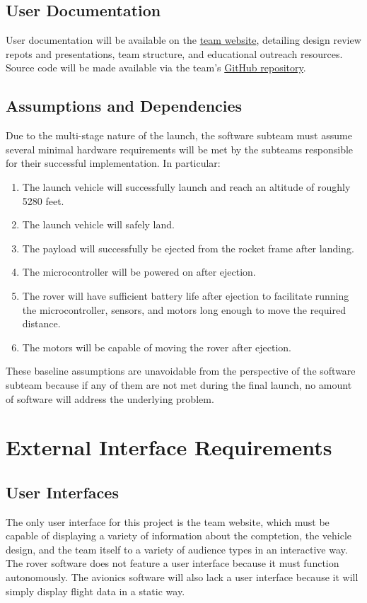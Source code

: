 \documentclass[onecolumn, draftclsnofoot, 10pt, compsoc]{IEEEtran}
\begin{document}
\subsection{User Documentation}
User documentation will be available on the \href{http://osuusli.com/}{team website}, detailing design review repots and presentations, team structure, and educational outreach resources. Source code will be made available via the team's \href{https://github.com/OSU-USLI-18/Payload-Software}{GitHub repository}.

\subsection{Assumptions and Dependencies}
Due to the multi-stage nature of the launch, the software subteam must assume several minimal hardware requirements will be met by the subteams responsible for their successful implementation. In particular:
\begin{enumerate}
\item The launch vehicle will successfully launch and reach an altitude of roughly 5280 feet.
\item The launch vehicle will safely land.
\item The payload will successfully be ejected from the rocket frame after landing.
\item The microcontroller will be powered on after ejection.
\item The rover will have sufficient battery life after ejection to facilitate running the microcontroller, sensors, and motors long enough to move the required distance.
\item The motors will be capable of moving the rover after ejection.
\end{enumerate}

These baseline assumptions are unavoidable from the perspective of the software subteam because if any of them are not met during the final launch, no amount of software will address the underlying problem.

\section{External Interface Requirements}

\subsection{User Interfaces}
The only user interface for this project is the team website, which must be capable of displaying a variety of information about the comptetion, the vehicle design, and the team itself to a variety of audience types in an interactive way. The rover software does not feature a user interface because it must function autonomously. The avionics software will also lack a user interface because it will simply display flight data in a static way.
\end{document}
